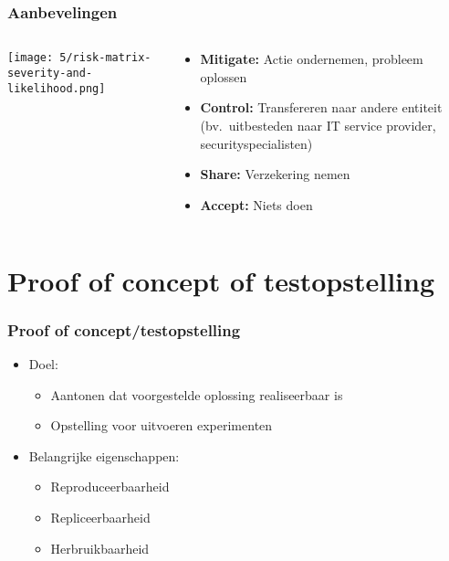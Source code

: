 \documentclass[aspectratio=169]{beamer}
\begin{document}
\begin{frame}
  \frametitle{Aanbevelingen}

  \begin{columns}
    \begin{column}{.5\textwidth}
      \texttt{[image: 5/risk-matrix-severity-and-likelihood.png]}
    \end{column}

    \begin{column}{.5\textwidth}
      \begin{itemize}
        \item \textbf{Mitigate:} Actie ondernemen, probleem oplossen
        \item \textbf{Control:} Transfereren naar andere entiteit (bv.\ uitbesteden naar IT service provider, securityspecialisten)
        \item \textbf{Share:} Verzekering nemen
        \item \textbf{Accept:} Niets doen
      \end{itemize}
    \end{column}
  \end{columns}

\end{frame}

\section{Proof of concept of testopstelling}

\begin{frame}
  \frametitle{Proof of concept/testopstelling}

  \begin{itemize}
    \item Doel:
          \begin{itemize}
            \item Aantonen dat voorgestelde oplossing realiseerbaar is
            \item Opstelling voor uitvoeren experimenten
          \end{itemize}
    \item Belangrijke eigenschappen:
          \begin{itemize}
            \item Reproduceerbaarheid
            \item Repliceerbaarheid
            \item Herbruikbaarheid
          \end{itemize}
  \end{itemize}

\end{frame}
\end{document}
